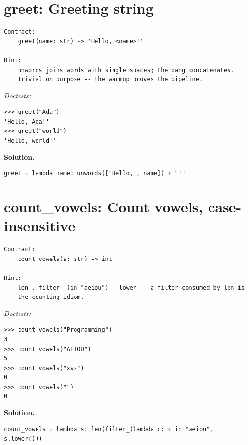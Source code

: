 \documentclass[11pt,letterpaper]{book}
\begin{document}
\section{greet: Greeting string}
\begin{lstlisting}[style=spec]
Contract:
    greet(name: str) -> 'Hello, <name>!'

Hint:
    unwords joins words with single spaces; the bang concatenates.
    Trivial on purpose -- the warmup proves the pipeline.
\end{lstlisting}
\noindent\textit{Doctests:}
\begin{lstlisting}[style=spec]
>>> greet("Ada")
'Hello, Ada!'
>>> greet("world")
'Hello, world!'
\end{lstlisting}
\noindent\textbf{Solution.}
\begin{lstlisting}[style=code]
greet = lambda name: unwords(["Hello,", name]) + "!"
\end{lstlisting}

\section{count\_vowels: Count vowels, case-insensitive}
\begin{lstlisting}[style=spec]
Contract:
    count_vowels(s: str) -> int

Hint:
    len . filter_ (in "aeiou") . lower -- a filter consumed by len is
    the counting idiom.
\end{lstlisting}
\noindent\textit{Doctests:}
\begin{lstlisting}[style=spec]
>>> count_vowels("Programming")
3
>>> count_vowels("AEIOU")
5
>>> count_vowels("xyz")
0
>>> count_vowels("")
0
\end{lstlisting}
\noindent\textbf{Solution.}
\begin{lstlisting}[style=code]
count_vowels = lambda s: len(filter_(lambda c: c in "aeiou", s.lower()))
\end{lstlisting}
\end{document}
